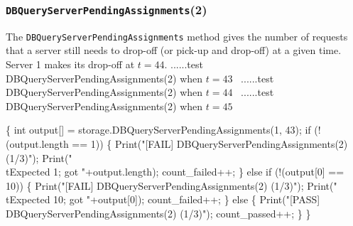 \documentclass{article}
\def\nwendcode{\endtrivlist \endgroup}
\let\nwdocspar=\par
\theoremstyle{definition}
\begin{document}
\subsubsection{{\tt{}DBQueryServerPendingAssignments}(2)}
The {\tt{}DBQueryServerPendingAssignments} method gives the number of requests that
a server still needs to drop-off (or pick-up and drop-off) at a given time.
Server 1 makes its drop-off at $t=44$.
\nwenddocs{}\endmoddef{}
  \LA{}......test \code{}DBQueryServerPendingAssignments\edoc{}(2) when $t=43$~{\nwtagstyle{}}\RA{}
  \LA{}......test \code{}DBQueryServerPendingAssignments\edoc{}(2) when $t=44$~{\nwtagstyle{}}\RA{}
  \LA{}......test \code{}DBQueryServerPendingAssignments\edoc{}(2) when $t=45$~{\nwtagstyle{}}\RA{}
\nwendcode{}\nwdocspar
\nwenddocs{}\endmoddef{}
\{
  int output[] = storage.DBQueryServerPendingAssignments(1, 43);
  if (!(output.length == 1)) \{
    Print("[FAIL] DBQueryServerPendingAssignments(2) (1/3)");
    Print("\\tExpected 1; got "+output.length);
    count_failed++;
  \} else if (!(output[0] == 10)) \{
    Print("[FAIL] DBQueryServerPendingAssignments(2) (1/3)");
    Print("\\tExpected 10; got "+output[0]);
    count_failed++;
  \} else \{
    Print("[PASS] DBQueryServerPendingAssignments(2) (1/3)");
    count_passed++;
  \}
\}
\nwendcode{}\nwdocspar
\nwenddocs{}\endmoddef{}
\end{document}

